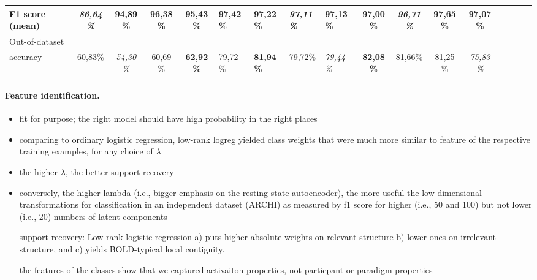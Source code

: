 \documentclass{article} %
\begin{document}
\begin{table}[h]
{\begin{tabular}{l|cccc|llllcccc|llll|}
  F1 score (mean)           & \textit{86,64\%}                   & 94,89\%                            & \textbf{96,38\%}                   & 95,43\%                             & \textbf{97,42\%}                     & 97,22\%                              & \textit{97,11\%}                     & 97,13\%                               & 97,00\%          & \textit{96,71\%} & \textbf{97,65\%} & 97,07\%                            \\ \hline
  Out-of-dataset \\accuracy & 60,83\%                            & \textit{54,30\%}                   & 60,69\%                            & \textbf{62,92\%}                    & 79,72\%                              & \textbf{81,94\%} & 79,72\%           & \textit{79,44\%}                     & \textbf{82,08\%} & 81,66\%            & 81,25\%          & \textit{75,83\%}                   \\ \hline
  \end{tabular}

}
\end{table}

\paragraph{Feature identification.}
\begin{itemize}
  \item{fit for purpose; the right model should have
  high probability in the right places}
  \item{comparing to ordinary logistic regression, low-rank logreg yielded class weights 
  that were much more similar to feature of the respective training examples,
  for any choice of $\lambda$}
  \item{the higher $\lambda$, the better support recovery}
  \item{conversely, the higher lambda (i.e., bigger emphasis on the
  resting-state autoencoder), the more useful the low-dimensional transformations
  for classification in an independent dataset (ARCHI) as measured by f1 score
  for higher (i.e., 50 and 100) but not lower (i.e., 20) numbers
  of latent components}

support recovery:
Low-rank logistic regression
a) puts higher absolute weights on relevant structure
b) lower ones on irrelevant structure,
and
c) yields BOLD-typical local contiguity.

the features of the classes show that we captured activaiton properties,
not particpant or paradigm properties
\end{itemize}
\end{document}
